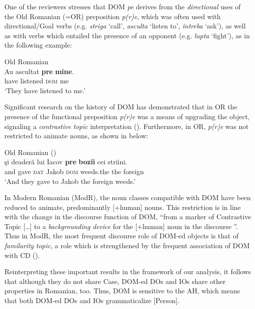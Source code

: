 \documentclass[output=paper,colorlinks,citecolor=brown,nonflat]{./langscibook}
\begin{document}
One of the reviewers stresses that DOM \textit{pe} derives from the \textit{directional} uses of the Old Romanian (=OR) preposition \textit{p(r)e}, which was often used with directional/Goal verbs (e.g. \textit{striga} ‘call’, \textit{asculta} ‘listen to’, \textit{întreba} ‘ask’), as well as with verbs which entailed the presence of an opponent (e.g. \textit{lupta} ‘fight’), as in the following example: 

\ea%
      \label{ex:cornilescu:19}
      Old Romanian \citep[395]{HillMardale2017}\\
      \gll Au  ascultat	\textbf{pre} \textbf{mine}.\\
            have listened \textsc{dom} me\\
      \glt ‘They have listened to me.’
      \z



Significant research on the history of DOM has demonstrated that in OR the presence of the functional preposition \textit{p(r)e} was a means of upgrading the object, signaling a \textit{contrastive} \textit{topic} interpretation (\citealt{Hill2013, HillMardale2017}). Furthermore, in OR, \textit{p(r)e} was not restricted to animate nouns, as shown in  below:

\ea%
      \label{ex:cornilescu:20}
      Old Romanian  (\citealt[396]{HillMardale2017}) \\
      \gll  şi deaderă lui Iacov \textbf{pre} \textbf{bozii} cei striini.\\
             and gave \textsc{dat} Jakob \textsc{dom} weeds.the the foreign\\
      \glt ‘And they gave to Jakob the foreign weeds.’
      \z

In Modern Romanian (ModR), the noun classes compatible with DOM have been reduced to animate, predominantly [+human] nouns. This restriction is in line with the change in the discourse function of DOM, “from a marker of Contrastive Topic […] to a \textit{backgrounding} \textit{device} for the [+human] noun in the discourse \citep[147]{Hill2013}”. Thus in ModR, the most frequent discourse role of DOM-ed objects is that of \textit{familarity} \textit{topic}, a role which is strengthened by the frequent association of DOM with CD (\citealt{HillMardale2017}).

Reinterpreting these important results in the framework of our analysis, it follows that although they do not share Case, DOM-ed DOs and IOs share other properties in Romanian, too. Thus, DOM is sensitive to the AH, which means that both DOM-ed DOs and IOs grammaticalize [Person].
\end{document}
